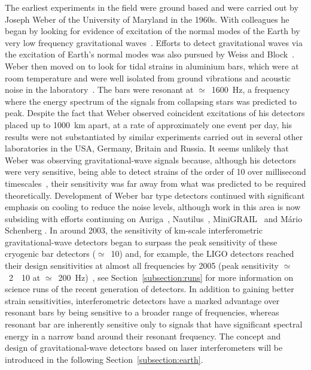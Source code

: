 The earliest experiments in the field were ground based and were carried out by
Joseph Weber of the University of Maryland in the 1960s. With colleagues he
began by looking for evidence of excitation of the normal modes of the Earth by
very low frequency gravitational waves~\cite{Forward2}. Efforts to detect gravitational
waves via the excitation of Earth's normal modes was also pursued by Weiss and Block~\cite{Weiss:1965}.
Weber then moved on to look for tidal strains in aluminium bars, which were at room temperature and were
well isolated from ground vibrations and acoustic noise in the
laboratory~\cite{Weber1, Weber2}. The bars were resonant at $\simeq$~1600~Hz, a
frequency where the energy spectrum of the signals from collapsing stars was
predicted to peak. Despite the fact that Weber observed coincident excitations
of his detectors placed up to 1000~km apart, at a rate of approximately one
event per day, his results were not substantiated by similar experiments carried
out in several other laboratories in the USA, Germany, Britain and Russia. It
seems unlikely that Weber was observing gravitational-wave signals because,
although his detectors were very sensitive, being able to detect strains of the
order of 10 over millisecond timescales~\cite{Weber1}, their sensitivity
was far away from what was predicted to be required theoretically. Development
of Weber bar type detectors continued with significant emphasis on cooling to
reduce the noise levels, although work in this area is now subsiding with
efforts continuing on Auriga~\cite{AURIGA}, Nautilus~\cite{NAUTILUS},
MiniGRAIL~\cite{MiniGRAIL, Gottardi:2007} and M\'{a}rio Schenberg
\cite{Schenberg, Aguiar:2006}.  In around 2003, the sensitivity of km-scale
interferometric gravitational-wave detectors began to surpass the peak
sensitivity of these cryogenic bar detectors ($\simeq$~10)
and, for example, the LIGO detectors reached their design sensitivities at
almost all frequencies by 2005 (peak sensitivity
$\simeq$~2~\texttimes~10 at
$\simeq$~200~Hz)~\cite{Whitcomb:2008}, see
Section~\ref{subsection:runs} for more information on science runs of
the recent generation of detectors.  In addition to gaining better
strain sensitivities, interferometric detectors have a marked
advantage over resonant bars by being sensitive to a broader range of
frequencies, whereas resonant bar are inherently sensitive only to
signals that have significant spectral energy in a narrow band around
their resonant frequency. The concept and design of gravitational-wave
detectors based on laser interferometers will be introduced in the
following Section~\ref{subsection:earth}. 



